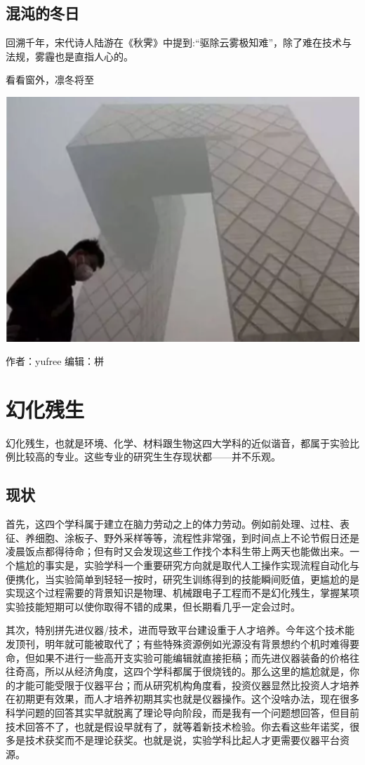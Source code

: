 \documentclass[]{book}
\begin{document}
\subsection{混沌的冬日}\label{-1}

回溯千年，宋代诗人陆游在《秋霁》中提到:``驱除云雾极知难''，除了难在技术与法规，雾霾也是直指人心的。

看看窗外，凛冬将至

\includegraphics[width=6.67in]{images/cw5}

作者：yufree 编辑：栟

\section{幻化残生}

幻化残生，也就是环境、化学、材料跟生物这四大学科的近似谐音，都属于实验比例比较高的专业。这些专业的研究生生存现状都------并不乐观。

\subsection{现状}

首先，这四个学科属于建立在脑力劳动之上的体力劳动。例如前处理、过柱、表征、养细胞、涂板子、野外采样等等，流程性非常强，到时间点上不论节假日还是凌晨饭点都得待命；但有时又会发现这些工作找个本科生带上两天也能做出来。一个尴尬的事实是，实验学科一个重要研究方向就是取代人工操作实现流程自动化与便携化，当实验简单到轻轻一按时，研究生训练得到的技能瞬间贬值，更尴尬的是实现这个过程需要的背景知识是物理、机械跟电子工程而不是幻化残生，掌握某项实验技能短期可以使你取得不错的成果，但长期看几乎一定会过时。

其次，特别拼先进仪器/技术，进而导致平台建设重于人才培养。今年这个技术能发顶刊，明年就可能被取代了；有些特殊资源例如光源没有背景想约个机时难得要命，但如果不进行一些高开支实验可能编辑就直接拒稿；而先进仪器装备的价格往往奇高，所以从经济角度，这四个学科都属于很烧钱的。那么这里的尴尬就是，你的才能可能受限于仪器平台；而从研究机构角度看，投资仪器显然比投资人才培养在初期更有效果，而人才培养初期其实也就是仪器操作。这个没啥办法，现在很多科学问题的回答其实早就脱离了理论导向阶段，而是我有一个问题想回答，但目前技术回答不了，也就是假设早就有了，就等着新技术检验。你去看这些年诺奖，很多是技术获奖而不是理论获奖。也就是说，实验学科比起人才更需要仪器平台资源。
\end{document}
